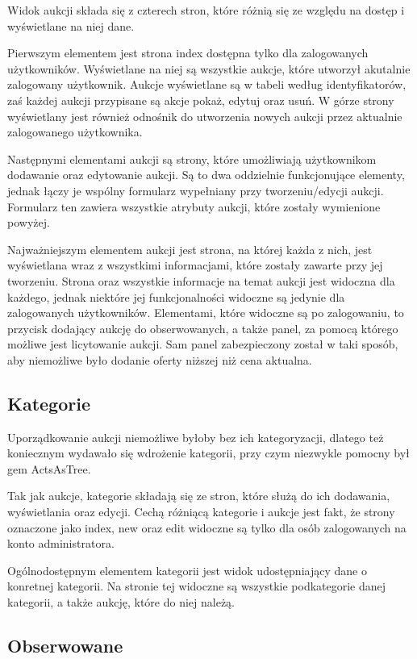 \documentclass[brudnopis]{xmgr}
\begin{document}
Widok aukcji składa się z czterech stron, które różnią się ze względu na dostęp i wyświetlane na niej dane.

Pierwszym elementem jest strona index dostępna tylko dla zalogowanych użytkowników. Wyświetlane na niej są wszystkie aukcje, które utworzył akutalnie zalogowany użytkownik. Aukcje wyświetlane są w tabeli według identyfikatorów, zaś każdej aukcji przypisane są akcje pokaż, edytuj oraz usuń. W górze strony wyświetlany jest również odnośnik do utworzenia nowych aukcji przez aktualnie zalogowanego użytkownika.

Następnymi elementami aukcji są strony, które umożliwiają użytkownikom dodawanie oraz edytowanie aukcji. Są to dwa oddzielnie funkcjonujące elementy, jednak łączy je wspólny formularz wypełniany przy tworzeniu/edycji aukcji. Formularz ten zawiera wszystkie atrybuty aukcji, które zostały wymienione powyżej.

Najważniejszym elementem aukcji jest strona, na której każda z nich, jest wyświetlana wraz z wszystkimi informacjami, które zostały zawarte przy jej tworzeniu. Strona oraz wszystkie informacje na temat aukcji jest widoczna dla każdego, jednak niektóre jej funkcjonalności widoczne są jedynie dla zalogowanych użytkowników. Elementami, które widoczne są po zalogowaniu, to przycisk dodający aukcję do obserwowanych, a także panel, za pomocą którego możliwe jest licytowanie aukcji. Sam panel zabezpieczony został w taki sposób, aby niemożliwe było dodanie oferty niższej niż cena aktualna.

\subsection{Kategorie}

Uporządkowanie aukcji niemożliwe byłoby bez ich kategoryzacji, dlatego też koniecznym wydawało się wdrożenie kategorii, przy czym niezwykle pomocny był gem ActsAsTree. 

Tak jak aukcje, kategorie składają się ze stron, które służą do ich dodawania, wyświetlania oraz edycji. Cechą różniącą kategorie i aukcje jest fakt, że strony oznaczone jako index, new oraz edit widoczne są tylko dla osób zalogowanych na konto administratora.

Ogólnodostępnym elementem kategorii jest widok udostępniający dane o konretnej kategorii. Na stronie tej widoczne są wszystkie podkategorie danej kategorii, a także aukcję, które do niej należą. 

\subsection{Obserwowane}
\end{document}
